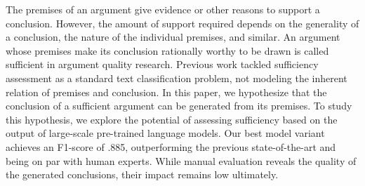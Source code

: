 The premises of an argument give evidence or other reasons to support a conclusion. However, the amount of support required depends on the generality of a conclusion, the nature of the individual premises, and similar. An argument whose premises make its conclusion rationally worthy to be drawn is called sufficient in argument quality research. Previous work tackled sufficiency assessment as a standard text classification problem, not modeling the inherent relation of premises and conclusion. In this paper, we hypothesize that the conclusion of a sufficient argument can be generated from its premises. To study this hypothesis, we explore the potential of assessing sufficiency based on the output of large-scale pre-trained language models. Our best model variant achieves an F1-score of .885, outperforming the previous state-of-the-art and being on par with human experts. While manual evaluation reveals the quality of the generated conclusions, their impact remains low ultimately.
